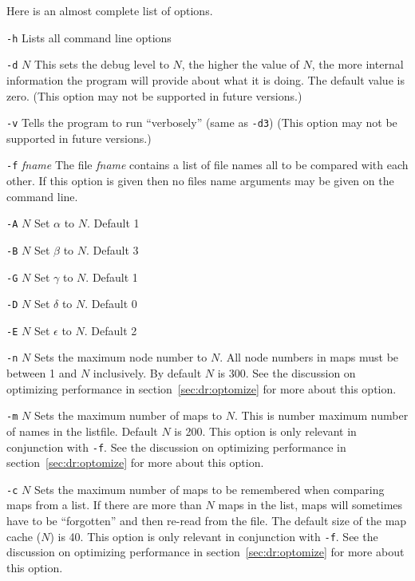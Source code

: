\documentclass[%
	11pt,
        a4paper,
        twoside]{workrep}
\newlength{\lentrylen}
\newcommand{\lentrylabel}[1]{%
   \settowidth{\lentrylen}{#1}%
   \ifthenelse{\lengthtest{\lentrylen > \labelwidth}}%
      {\parbox[b]{\labelwidth}{\makebox[0pt][l]{#1}\\}}%
      {#1}%
   \hfil\relax}
\newenvironment{optlist}[1][35pt]
    {\renewcommand{\entrylabel}{\lentrylabel}\begin{entry}[#1]}
    {\end{entry}}
\newenvironment{entry}[1][35pt]
  {\begin{list}{}%
    {\renewcommand{\makelabel}{\entrylabel}%
      \setlength{\labelwidth}{#1}%
      \setlength{\leftmargin}{\labelwidth}%
      \addtolength{\leftmargin}{\labelsep}}}
  {\end{list}}
\newcommand{\entrylabel}[1]{\mbox{\textsf{#1:}}\hfil}
\begin{document}
Here is an almost complete list of options.
\begin{optlist}
\item[\texttt{-h}]
        Lists all command line options

\item[\texttt{-d} $N$]
 	This sets the debug level to $N$, the higher the value
	of $N$, the more internal information the program will
	provide about what it is doing.  The default value is
	zero.  (This option may not be supported in future
	versions.)

\item[\texttt{-v}]
	Tells the program to run ``verbosely'' (same as \verb|-d3|)
        (This option may not be supported in future versions.)

\item[\texttt{-f} \textit{fname}]
	The file \textit{fname} contains a list of file names all to
	be compared with each other.  If this option is given
	then no files name arguments may be given on the command
	line.

\item[\texttt{-A} $N$]
	Set $\alpha$ to $N$.  Default 1

\item[\texttt{-B} $N$]
	Set $\beta$ to $N$.  Default 3

\item[\texttt{-G} $N$]
	Set $\gamma$ to $N$.  Default 1

\item[\texttt{-D} $N$]
	Set $\delta$ to $N$.  Default 0

\item[\texttt{-E} $N$]
	Set $\epsilon$ to $N$.  Default 2

\item[\texttt{-n} $N$]
	Sets the maximum node number to $N$.  All node numbers
	in maps must be between 1 and $N$ inclusively.  By
	default $N$ is 300.
	See the discussion on optimizing performance
	in section~\ref{sec:dr:optomize}
        for more about this option.

\item[\texttt{-m} $N$]
	Sets the maximum number of maps to $N$.  This is number
	maximum number of names in the listfile.
	Default $N$ is 200.
	This option is only relevant in conjunction with \texttt{-f}.
	See the discussion on optimizing performance
	in section~\ref{sec:dr:optomize}
        for more about this option.

\item[\texttt{-c} $N$]
	Sets the maximum number of maps to be remembered
	when comparing maps from a list.  If there are more
	than $N$ maps in the list, maps will sometimes have
	to be ``forgotten'' and then re-read from the file.
	The default size of the map cache ($N$) is 40.
	This option is only relevant in conjunction with \texttt{-f}.
	See the discussion on optimizing performance
	in section~\ref{sec:dr:optomize}
        for more about this option.


\end{optlist}
\end{document}
